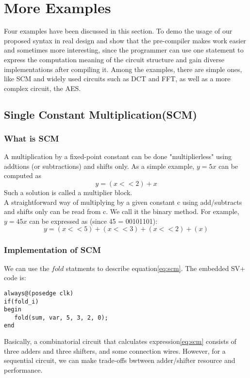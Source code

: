 \section{More Examples}
Four examples have been discussed in this section. To demo the usage of our proposed syntax in real design and show that the pre-compiler makes work easier and sometimes more interesting, since the programmer can use one statement to express the computation meaning of the circuit structure and gain diverse implementations after compiling it. Among the examples, there are simple ones, like SCM\cite{SCM} and widely used circuits such as DCT and FFT, as well as a more complex circuit, the AES\cite{AES}.
\subsection{Single Constant Multiplication(SCM)}
\subsubsection{What is SCM}
A multiplication by a fixed-point constant can be done "multiplierless" using addtions (or subtractions) and shifts only. As a simple example,
\begin{math}
y = 5x
\end{math}
can be computed as
\begin{equation}
y = (x<<2) + x
\end{equation}
Such a solution is called a multiplier block.\\
A straightforward way of multiplying by a given constant c using add/subtracts and shifts only can be read from c. We call it the binary method. For example,
\begin{math}
y = 45x
\end{math}
can be expressed as (since 45 = 00101101):
\begin{equation}
y = (x<<5) + (x<<3) + (x<<2) + (x)
\label{eq:scm}
\end{equation}
\subsubsection{Implementation of SCM}
We can use the $fold$ statments to describe equation\eqref{eq:scm}. The embedded SV+ code is:
\begin{verbatim}
always@(posedge clk)
if(fold_i)
begin
   fold(sum, var, 5, 3, 2, 0);
end
\end{verbatim}
Basically, a combinatorial circuit that calculates expression\eqref{eq:scm} consists of three adders and three shifters, and some connection wires. However, for a sequential circuit, we can make trade-offs bwtween adder/shifter resource and performance.

